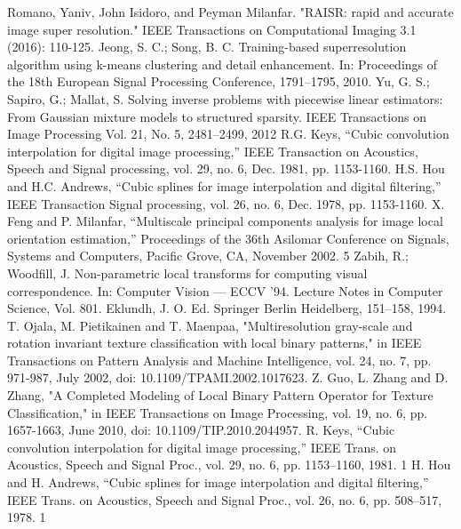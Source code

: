 \documentclass[12pt, a4paper, oneside]{ctexbook}
\begin{document}
	
	
	
	\newpage
	\begin{thebibliography}{99}
		Romano, Yaniv, John Isidoro, and Peyman Milanfar. "RAISR: rapid and accurate image super resolution." IEEE Transactions on Computational Imaging 3.1 (2016): 110-125.
		Jeong, S. C.; Song, B. C. Training-based superresolution algorithm using k-means clustering and detail enhancement. In: Proceedings of the 18th European Signal Processing Conference, 1791–1795, 2010.
		 Yu, G. S.; Sapiro, G.; Mallat, S. Solving inverse problems with piecewise linear estimators: From Gaussian mixture models to structured sparsity. IEEE Transactions on Image Processing Vol. 21, No. 5, 2481–2499, 2012
		R.G. Keys, “Cubic convolution interpolation for digital image processing,” IEEE Transaction on Acoustics, Speech and Signal processing, vol. 29, no. 6, Dec. 1981, pp. 1153-1160.
		H.S. Hou and H.C. Andrews, “Cubic splines for image interpolation and digital filtering,” IEEE Transaction Signal processing, vol. 26, no. 6, Dec. 1978, pp. 1153-1160.
		X. Feng and P. Milanfar, “Multiscale principal components analysis for image local orientation estimation,” Proceedings of the 36th Asilomar Conference on Signals, Systems and Computers, Pacific Grove, CA, November 2002. 5
		Zabih, R.; Woodfill, J. Non-parametric local transforms for computing visual correspondence. In: Computer Vision — ECCV ’94. Lecture Notes in Computer Science, Vol. 801. Eklundh, J. O. Ed. Springer Berlin Heidelberg, 151–158, 1994.
		T. Ojala, M. Pietikainen and T. Maenpaa, "Multiresolution gray-scale and rotation invariant texture classification with local binary patterns," in IEEE Transactions on Pattern Analysis and Machine Intelligence, vol. 24, no. 7, pp. 971-987, July 2002, doi: 10.1109/TPAMI.2002.1017623.
		Z. Guo, L. Zhang and D. Zhang, "A Completed Modeling of Local Binary Pattern Operator for Texture Classification," in IEEE Transactions on Image Processing, vol. 19, no. 6, pp. 1657-1663, June 2010, doi: 10.1109/TIP.2010.2044957.
		 R. Keys, “Cubic convolution interpolation for digital image processing,” IEEE Trans. on Acoustics, Speech and Signal Proc., vol. 29, no. 6, pp. 1153–1160, 1981. 1
		H. Hou and H. Andrews, “Cubic splines for image interpolation and digital filtering,” IEEE Trans. on Acoustics, Speech and Signal Proc., vol. 26, no. 6, pp. 508–517, 1978. 1		
	\end{thebibliography}
	
	
\end{document}
